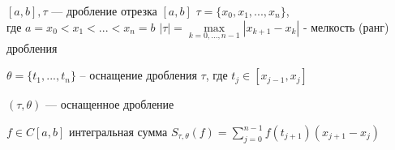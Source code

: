 \begin{definition}
    $[a, b], \tau $ --- дробление отрезка $[a, b]$ $\tau = \{ x_0, x_1, ..., x_n \}$, \\ где $a = x_0 < x_1 < ... < x_n = b$ \quad $|\tau| = \max\limits_{k = 0, ..., n - 1}{|x_{k + 1} - x_k|}$ - мелкость (ранг) дробления

    $\theta = \{ t_1, ..., t_n\}$ -- оснащение дробления $\tau$, где $t_j \in [x_{j - 1}, x_j]$

    $(\tau, \theta) $ --- оснащенное дробление

    $f \in C[a, b]$ интегральная сумма $S_{\tau, \theta} (f) = \sum\limits_{j = 0}^{n - 1} f(t_{j + 1}) (x_{j + 1} - x_j)$
\end{definition}



\quad


 
